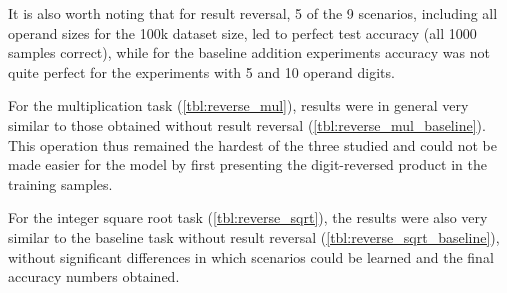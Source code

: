It is also worth noting that for result reversal, 5 of the 9 scenarios, including all operand sizes for the 100k dataset size, led to perfect test accuracy (all 1000 samples correct), while for the baseline addition experiments accuracy was not quite perfect for the experiments with 5 and 10 operand digits.

For the multiplication task (\cref{tbl:reverse_mul}), results were in general very similar to those obtained without result reversal (\cref{tbl:reverse_mul_baseline}). This operation thus remained the hardest of the three studied and could not be made easier for the model by first presenting the digit-reversed product in the training samples.

For the integer square root task (\cref{tbl:reverse_sqrt}), the results were also very similar to the baseline task without result reversal (\cref{tbl:reverse_sqrt_baseline}), without significant differences in which scenarios could be learned and  the final accuracy numbers obtained.

\begin{table}[!htbp]
	\begin{minipage}[t]{0.47\linewidth}
		\hfill
		\label{tbl:reverse_add_baseline}
	\end{minipage}
	\hfill %
	\begin{minipage}[t]{0.47\linewidth}
		\hfill
		\label{tbl:reverse_add}
	\end{minipage}
\end{table}

\begin{table}[!htbp]
	\begin{minipage}[t]{0.47\linewidth}
		\hfill
		\label{tbl:reverse_mul_baseline}
	\end{minipage}
	\hfill %
	\begin{minipage}[t]{0.47\linewidth}
		\hfill
		\label{tbl:reverse_mul}
	\end{minipage}
\end{table}

